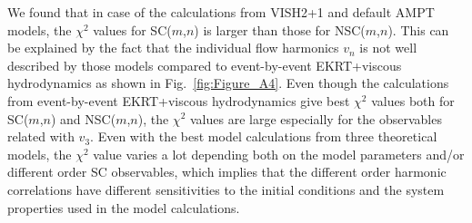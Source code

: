 We found that in case of the calculations from VISH2+1 and default AMPT models, the ${\chi}^2$ values for SC($m$,$n$) is larger than those for NSC($m$,$n$). This can be explained by the fact that the individual flow harmonics $v_n$ is not well described by those models compared to event-by-event EKRT+viscous hydrodynamics as shown in Fig.~\ref{fig:Figure_A4}.
Even though the calculations from event-by-event EKRT+viscous hydrodynamics give best ${\chi}^2$ values both for SC($m$,$n$) and NSC($m$,$n$), the ${\chi}^2$
values are large especially for the observables related with $v_3$. 
Even with the best model calculations from three theoretical models, the ${\chi}^2$ value varies a lot depending both on the model parameters and/or different order SC observables, which implies that the different order harmonic correlations have different sensitivities to the initial conditions and the system properties used in the model calculations.







